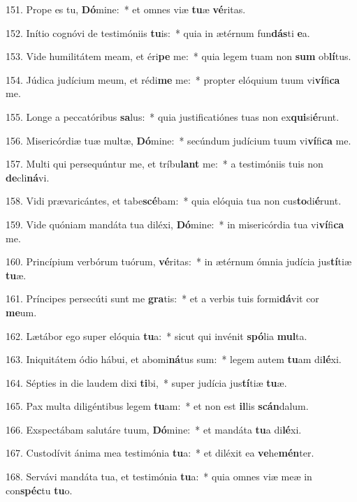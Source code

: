 151. Prope es tu, \textbf{Dó}mine:~*  et omnes viæ \textbf{tu}æ \textbf{vé}ritas.\

152. Inítio cognóvi de testimóniis \textbf{tu}is:~*  quia in ætérnum fun\textbf{dás}ti \textbf{e}a.\

153. Vide humilitátem meam, et éri\textbf{pe} me:~*  quia legem tuam non \textbf{sum} ob\textbf{lí}tus.\

154. Júdica judícium meum, et rédi\textbf{me} me:~*  propter elóquium tuum vi\textbf{ví}fi\textbf{ca} me.\

155. Longe a peccatóribus \textbf{sa}lus:~*  quia justificatiónes tuas non ex\textbf{qui}si\textbf{é}runt.\

156. Misericórdiæ tuæ multæ, \textbf{Dó}mine:~*  secúndum judícium tuum vi\textbf{ví}fi\textbf{ca} me.\

157. Multi qui persequúntur me, et tríbu\textbf{lant} me:~*  a testimóniis tuis non \textbf{de}cli\textbf{ná}vi.\

158. Vidi prævaricántes, et tabe\textbf{scé}bam:~*  quia elóquia tua non cus\textbf{to}di\textbf{é}runt.\

159. Vide quóniam mandáta tua diléxi, \textbf{Dó}mine:~*  in misericórdia tua vi\textbf{ví}fi\textbf{ca} me.\

160. Princípium verbórum tuórum, \textbf{vé}ritas:~*  in ætérnum ómnia judícia jus\textbf{tí}tiæ \textbf{tu}æ.\

161. Príncipes persecúti sunt me \textbf{gra}tis:~*  et a verbis tuis formi\textbf{dá}vit cor \textbf{me}um.\

162. Lætábor ego super elóquia \textbf{tu}a:~*  sicut qui invénit \textbf{spó}lia \textbf{mul}ta.\

163. Iniquitátem ódio hábui, et abomi\textbf{ná}tus sum:~*  legem autem \textbf{tu}am di\textbf{lé}xi.\

164. Sépties in die laudem dixi \textbf{ti}bi,~*  super judícia jus\textbf{tí}tiæ \textbf{tu}æ.\

165. Pax multa diligéntibus legem \textbf{tu}am:~*  et non est \textbf{il}lis \textbf{scán}dalum.\

166. Exspectábam salutáre tuum, \textbf{Dó}mine:~*  et mandáta \textbf{tu}a di\textbf{lé}xi.\

167. Custodívit ánima mea testimónia \textbf{tu}a:~*  et diléxit ea \textbf{ve}he\textbf{mén}ter.\

168. Servávi mandáta tua, et testimónia \textbf{tu}a:~*  quia omnes viæ meæ in con\textbf{spéc}tu \textbf{tu}o.\


